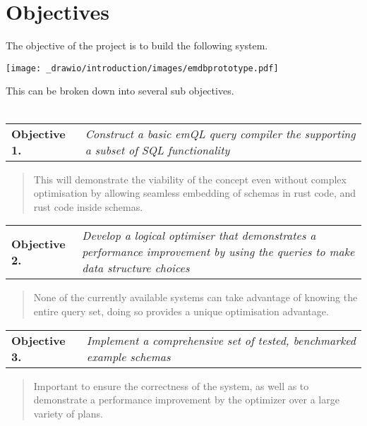 \section{Objectives}
The objective of the project is to build the following system.
\begin{center}
    \texttt{[image: \_drawio/introduction/images/emdbprototype.pdf]}
\end{center}
This can be broken down into several sub objectives.
\\
\\
\begin{tabular}{l p{}}
    \textbf{Objective 1.} & \textit{Construct a basic emQL query compiler the supporting a subset of SQL functionality}
\end{tabular}
\begin{quote}
    This will demonstrate the viability of the concept even without complex
    optimisation by allowing seamless embedding of schemas in rust code, and rust code inside schemas.
\end{quote}
\begin{tabular}{l p{}}
    \textbf{Objective 2.} & \textit{Develop a logical optimiser that demonstrates a performance improvement by using the queries to make data structure choices}
\end{tabular}
\begin{quote}
    None of the currently available systems can take advantage of knowing the entire
    query set, doing so provides a unique optimisation advantage.
\end{quote}
\begin{tabular}{l p{}}
    \textbf{Objective 3.} & \textit{Implement a comprehensive set of tested, benchmarked example schemas}
\end{tabular}
\begin{quote}
    Important to ensure the correctness of the system, as well as to demonstrate a performance
    improvement by the optimizer over a large variety of plans.
\end{quote}